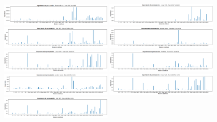 \begin{appendix}
\begin{figure}[h!]
\centering
  \includegraphics[width=0.49\textwidth]{Kap6/test=b234RF_permutation_variable_importance_scores.png} 
  \includegraphics[width=0.49\textwidth]{Kap6/test=b234L_permutation_variable_importance_scores.png} \\
  \includegraphics[width=0.49\textwidth]{Kap6/test=b234RBF_permutation_variable_importance_scores.png} 
    \includegraphics[width=0.49\textwidth]{Kap6/test=b261RF_permutation_variable_importance_scores.png} \\
  \includegraphics[width=0.49\textwidth]{Kap6/test=b261L_permutation_variable_importance_scores.png} 
  \includegraphics[width=0.49\textwidth]{Kap6/test=b261RBF_permutation_variable_importance_scores.png} \\
    \includegraphics[width=0.49\textwidth]{Kap6/test=b360RF_permutation_variable_importance_scores.png} 
  \includegraphics[width=0.49\textwidth]{Kap6/test=b360L_permutation_variable_importance_scores.png} \\
  \includegraphics[width=0.49\textwidth]{Kap6/test=b360RBF_permutation_variable_importance_scores.png}
\end{figure}


\end{appendix}
